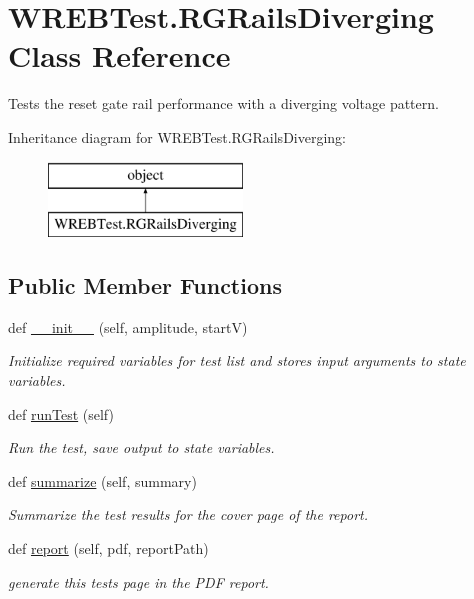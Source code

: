 \hypertarget{class_w_r_e_b_test_1_1_r_g_rails_diverging}{}\section{W\+R\+E\+B\+Test.\+R\+G\+Rails\+Diverging Class Reference}
\label{class_w_r_e_b_test_1_1_r_g_rails_diverging}


Tests the reset gate rail performance with a diverging voltage pattern.  


Inheritance diagram for W\+R\+E\+B\+Test.\+R\+G\+Rails\+Diverging\+:\begin{figure}[H]
\begin{center}
\leavevmode
\includegraphics[height=2.000000cm]{class_w_r_e_b_test_1_1_r_g_rails_diverging}
\end{center}
\end{figure}
\subsection*{Public Member Functions}
\begin{DoxyCompactItemize}
\item 
def \hyperlink{class_w_r_e_b_test_1_1_r_g_rails_diverging_a7fab6121125ab257cc56bc703393fe08}{\+\_\+\+\_\+init\+\_\+\+\_\+} (self, amplitude, startV)
\begin{DoxyCompactList}\small\item\em Initialize required variables for test list and stores input arguments to state variables. \end{DoxyCompactList}\item 
def \hyperlink{class_w_r_e_b_test_1_1_r_g_rails_diverging_ac8d72cae4d14bb10d651b74ccfde9aa6}{run\+Test} (self)
\begin{DoxyCompactList}\small\item\em Run the test, save output to state variables. \end{DoxyCompactList}\item 
def \hyperlink{class_w_r_e_b_test_1_1_r_g_rails_diverging_a59dd2895cefaef9903db2fdc158880e9}{summarize} (self, summary)
\begin{DoxyCompactList}\small\item\em Summarize the test results for the cover page of the report. \end{DoxyCompactList}\item 
def \hyperlink{class_w_r_e_b_test_1_1_r_g_rails_diverging_aa78030a638e61164f7a8724be3b35072}{report} (self, pdf, report\+Path)
\begin{DoxyCompactList}\small\item\em generate this test\textquotesingle{}s page in the P\+DF report. \end{DoxyCompactList}\end{DoxyCompactItemize}


